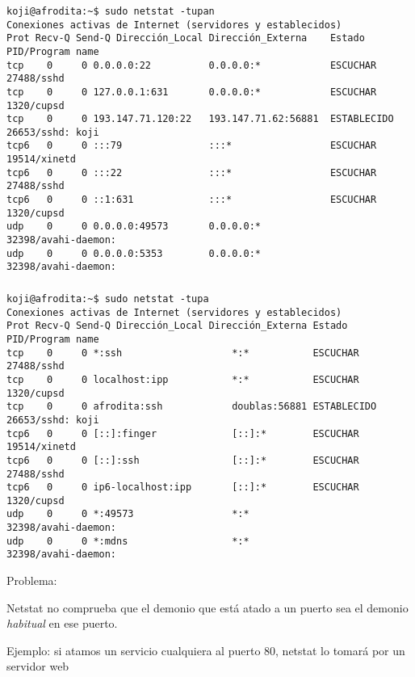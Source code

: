 \documentclass[ucs]{beamer}
\begin{document}
\begin{frame}[fragile]
\frametitle{}

  \begin{tiny}
  \begin{verbatim}
koji@afrodita:~$ sudo netstat -tupan
Conexiones activas de Internet (servidores y establecidos)
Prot Recv-Q Send-Q Dirección_Local Dirección_Externa    Estado      PID/Program name
tcp    0     0 0.0.0.0:22          0.0.0.0:*            ESCUCHAR    27488/sshd      
tcp    0     0 127.0.0.1:631       0.0.0.0:*            ESCUCHAR    1320/cupsd      
tcp    0     0 193.147.71.120:22   193.147.71.62:56881  ESTABLECIDO 26653/sshd: koji 
tcp6   0     0 :::79               :::*                 ESCUCHAR    19514/xinetd    
tcp6   0     0 :::22               :::*                 ESCUCHAR    27488/sshd      
tcp6   0     0 ::1:631             :::*                 ESCUCHAR    1320/cupsd      
udp    0     0 0.0.0.0:49573       0.0.0.0:*                        32398/avahi-daemon:
udp    0     0 0.0.0.0:5353        0.0.0.0:*                        32398/avahi-daemon:

  \end{verbatim}
  \end{tiny}

\end{frame}

%


\begin{frame}[fragile]
\frametitle{}


  \begin{tiny}
  \begin{verbatim}
koji@afrodita:~$ sudo netstat -tupa
Conexiones activas de Internet (servidores y establecidos)
Prot Recv-Q Send-Q Dirección_Local Dirección_Externa Estado      PID/Program name
tcp    0     0 *:ssh                   *:*           ESCUCHAR    27488/sshd      
tcp    0     0 localhost:ipp           *:*           ESCUCHAR    1320/cupsd      
tcp    0     0 afrodita:ssh            doublas:56881 ESTABLECIDO 26653/sshd: koji 
tcp6   0     0 [::]:finger             [::]:*        ESCUCHAR    19514/xinetd    
tcp6   0     0 [::]:ssh                [::]:*        ESCUCHAR    27488/sshd      
tcp6   0     0 ip6-localhost:ipp       [::]:*        ESCUCHAR    1320/cupsd      
udp    0     0 *:49573                 *:*                       32398/avahi-daemon:
udp    0     0 *:mdns                  *:*                       32398/avahi-daemon:

  \end{verbatim}
  \end{tiny}
Problema:

Netstat no comprueba que el demonio que está atado a un puerto sea
el demonio \emph{habitual} en ese puerto.

Ejemplo: si atamos un servicio cualquiera al puerto 80, netstat
lo tomará por un servidor web
\end{frame}
\end{document}
